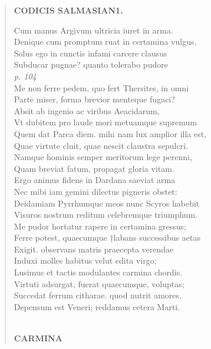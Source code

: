 \documentclass[11pt, a4paper]{report}
\begin{document}
\begin{verse}
     \marginpar{[165]} \begin{center} \textbf{CODICIS SALMASIAN1.} \end{center}Cum manus Argivum ultricia iuret in arma. \\ Denique cum promptum ruat in certamina vulgus, \\ Solus ego in cunctis infami carcere clausus \\ Subducar pugnae? quanto tolerabo pudore \\ \textit{p. 104} \\ Me non ferre pedem, quo fert Thersites, in omni \\ Parte miser, forma brevior menteque fugaci? \\ Absit ab ingenio ac viribus Aeacidarum, \\ Vt dubitem pro laude mori metuamque supremum \\ Quem dat Parca diem. mihi nam lux amplior illa est, \\ Quae virtute cluit, quae nescit claustra sepulcri. \\ Namque hominis semper meritorum lege perenni, \\ Quam breviat fatum, propagat gloria vitam. \\ Ergo animus fidens in Dardana saeviat arma \\ Nec mibi iam gemini dilectus pigneris obstet: \\ Deidamiam Pyrrhumque meos nunc Scyros habebit \\ Visuros nostrum reditum celebremque triumphum. \\ Me pudor hortatur rapere in certamina gressus; \\ Ferre potest, quaecumque †labans successibus aetas \\ Exigit. observans matris praecepta verendae \\ Induxi molles habitus velut edita virgo; \\ Lusimus et tactis modulantes carmina chordis. \\ Virtuti adsurgat, fuerat quaecumque, voluptas; \\ Succedat ferrum citharae. quod nutrit amores, \\ Depensum est Veneri; reddamus cetera Marti. \\ 
        ﻿\pagebreak 
     \marginpar{[166]} \begin{center} \textbf{CARMINA} \end{center}
      \end{verse}
  
\end{document}
